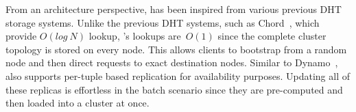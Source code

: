 From an architecture perspective, \projectname{} has been inspired
from various previous DHT storage systems. Unlike the previous DHT
systems, such as Chord~\cite{chord}, which provide $O(log~N)$ lookup,
\projectname{}'s lookups are~$O(1)$ since the complete cluster
topology is stored on every node. This allows clients to bootstrap
from a random node and then direct requests to exact destination
nodes. Similar to Dynamo~\cite{dynamo}, \projectname{} also supports
per-tuple based replication for availability purposes. Updating all of
these replicas is effortless in the batch scenario since they are
pre-computed and then loaded into a \projectname{} cluster at once. 
